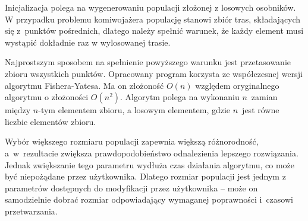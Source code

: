 Inicjalizacja polega na wygenerowaniu populacji złożonej z losowych osobników. W przypadku problemu komiwojażera populację stanowi zbiór tras, składających się z~punktów pośrednich, dlatego należy spełnić warunek, że każdy element musi wystąpić dokładnie raz w wylosowanej trasie.

Najprostszym sposobem na spełnienie powyższego warunku jest przetasowanie zbioru wszystkich punktów. Opracowany program korzysta ze współczesnej wersji algorytmu Fishera-Yatesa\cite{shuffle}. Ma on złożoność $O(n)$ względem oryginalnego algorytmu o złożoności $O(n^{2})$. Algorytm polega na wykonaniu $n$~zamian między $n$-tym elementem zbioru, a losowym elementem, gdzie $n$~jest równe liczbie elementów zbioru.

Wybór większego rozmiaru populacji zapewnia większą różnorodność, a~w~rezultacie zwiększa prawdopodobieństwo odnalezienia lepszego rozwiązania. Jednak zwiększanie tego parametru wydłuża czas działania algorytmu, co może być niepożądane przez użytkownika. Dlatego rozmiar populacji jest jednym z parametrów dostępnych do modyfikacji przez użytkownika -- może on samodzielnie dobrać rozmiar odpowiadający wymaganej poprawności i~czasowi przetwarzania.